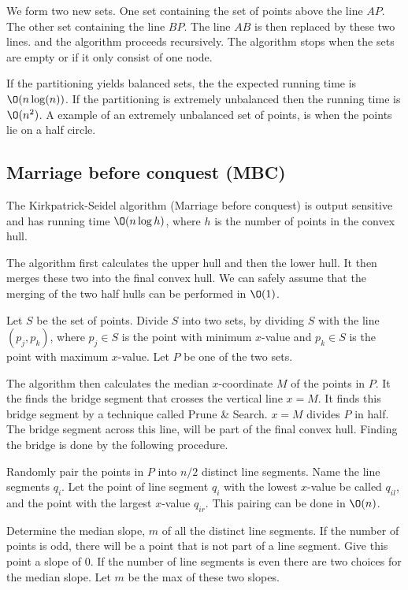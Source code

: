 \documentclass[10pt]{article}
\begin{document}
We form two new sets. One set containing the set of points above the line $AP$. The other set containing the line $BP$. The line $AB$ is then replaced by these two lines. and the algorithm proceeds recursively. The algorithm stops when the sets are empty or if it only consist of one node.

If the partitioning yields balanced sets, the the expected running time is $\O(n\log(n))$. If the partitioning is extremely unbalanced then the running time is $\O(n^2)$. A example of an extremely unbalanced set of points, is when the points lie on a half circle.



\subsection{Marriage before conquest (MBC)} %
\label{sub:marriage_before_conquest_mbc_}
The Kirkpatrick-Seidel algorithm (Marriage before conquest) is output sensitive and has running time $\O(n\log{h})$, where $h$ is the number of points in the convex hull.

The algorithm first calculates the upper hull and then the lower hull. It then merges these two into the final convex hull. We can safely assume that the merging of the two half hulls can be performed in $\O(1)$.

Let $S$ be the set of points. Divide $S$ into two sets, by dividing $S$ with the line $(p_j,p_k)$, where $p_j \in S$ is the point with minimum $x$-value and $p_k \in S$ is the point with maximum $x$-value. Let $P$ be one of the two sets.

The algorithm then calculates the median $x$-coordinate $M$ of the points in $P$. It the finds the bridge segment that crosses the vertical line $x=M$. It finds this bridge segment by a technique called Prune \& Search. $x=M$ divides $P$ in half. The bridge segment across this line, will be part of the final convex hull. Finding the bridge is done by the following procedure.

Randomly pair the points in $P$ into $n/2$ distinct line segments. Name the line segments $q_i$. Let the point of line segment $q_i$ with the lowest $x$-value be called $q_{il}$, and the point with the largest $x$-value $q_{ir}$. This pairing can be done in $\O(n)$.

Determine the median slope, $m$ of all the distinct line segments. If the number of points is odd, there will be a point that is not part of a line segment. Give this point a slope of $0$. If the number of line segments is even there are two choices for the median slope. Let $m$ be the max of these two slopes.
\end{document}
